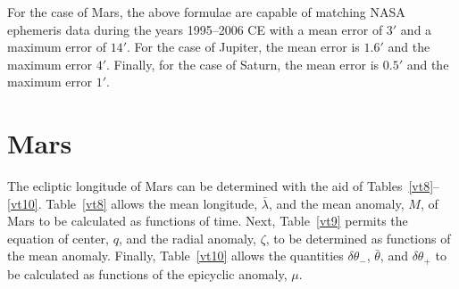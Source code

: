 For the case of Mars, the above formulae are capable of matching NASA ephemeris data during the years 1995--2006 CE
with a mean error of $3'$ and a maximum error of $14'$. For the case of Jupiter, the mean error is
$1.6'$ and the maximum error $4'$. Finally, for the case of Saturn, the mean error is $0.5'$ and the
maximum error $1'$. 

\section{Mars}
The ecliptic longitude of Mars can be determined with the aid of Tables~\ref{vt8}--\ref{vt10}. Table~\ref{vt8} allows
the mean longitude, $\bar{\lambda}$, and the mean anomaly, $M$, of Mars to be calculated as functions of
time. Next, Table~\ref{vt9} permits the equation of center, $q$, and the radial anomaly, $\zeta$, to
be determined as functions of the mean anomaly. Finally, Table~\ref{vt10} allows the quantities
$\delta\theta_-$, $\bar{\theta}$, and $\delta\theta_+$ to be calculated as functions of the epicyclic
anomaly, $\mu$. 

